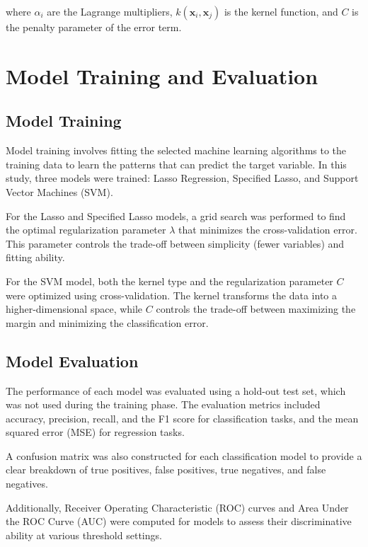 \documentclass[12pt]{article}
\begin{document}
where $\alpha_i$ are the Lagrange multipliers, $k(\mathbf{x}_i, \mathbf{x}_j)$ is the kernel function, and $C$ is the penalty parameter of the error term.



\section{Model Training and Evaluation}




\subsection{Model Training}
Model training involves fitting the selected machine learning algorithms to the training data to learn the patterns that can predict the target variable. In this study, three models were trained: Lasso Regression, Specified Lasso, and Support Vector Machines (SVM).

For the Lasso and Specified Lasso models, a grid search was performed to find the optimal regularization parameter \(\lambda\) that minimizes the cross-validation error. This parameter controls the trade-off between simplicity (fewer variables) and fitting ability.

For the SVM model, both the kernel type and the regularization parameter \(C\) were optimized using cross-validation. The kernel transforms the data into a higher-dimensional space, while \(C\) controls the trade-off between maximizing the margin and minimizing the classification error.




\subsection{Model Evaluation}
The performance of each model was evaluated using a hold-out test set, which was not used during the training phase. The evaluation metrics included accuracy, precision, recall, and the F1 score for classification tasks, and the mean squared error (MSE) for regression tasks.

A confusion matrix was also constructed for each classification model to provide a clear breakdown of true positives, false positives, true negatives, and false negatives.

Additionally, Receiver Operating Characteristic (ROC) curves and Area Under the ROC Curve (AUC) were computed for models to assess their discriminative ability at various threshold settings.
\end{document}

